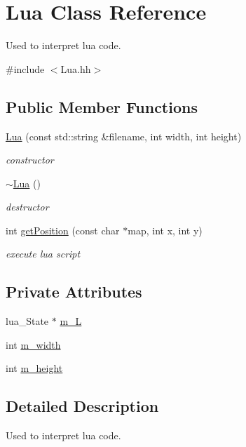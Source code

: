 \hypertarget{class_lua}{}\section{Lua Class Reference}
\label{class_lua}


Used to interpret lua code.  




{\ttfamily \#include $<$Lua.\+hh$>$}

\subsection*{Public Member Functions}
\begin{DoxyCompactItemize}
\item 
\hyperlink{class_lua_a66f77a6d234b10761a84837b7c248fb6}{Lua} (const std\+::string \&filename, int width, int height)
\begin{DoxyCompactList}\small\item\em constructor \end{DoxyCompactList}\item 
\hyperlink{class_lua_a9bee86df346ce88af90931d883565589}{$\sim$\+Lua} ()
\begin{DoxyCompactList}\small\item\em destructor \end{DoxyCompactList}\item 
int \hyperlink{class_lua_a1607480a84102a3541027cd9f85ad083}{get\+Position} (const char $\ast$map, int x, int y)
\begin{DoxyCompactList}\small\item\em execute lua script \end{DoxyCompactList}\end{DoxyCompactItemize}
\subsection*{Private Attributes}
\begin{DoxyCompactItemize}
\item 
lua\+\_\+\+State $\ast$ \hyperlink{class_lua_a3a68639a2ab4bf024edff06249133213}{m\+\_\+\+L}
\item 
int \hyperlink{class_lua_a2b60317a0bed9ba18dd8190036f24f36}{m\+\_\+width}
\item 
int \hyperlink{class_lua_ad64ba14c8b9ad0c8833c8c837b376605}{m\+\_\+height}
\end{DoxyCompactItemize}


\subsection{Detailed Description}
Used to interpret lua code. 

